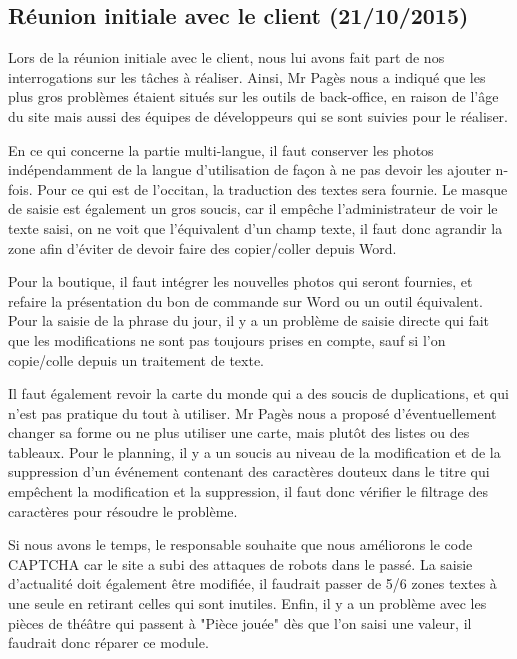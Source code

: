\documentclass[11pt]{report}
\begin{document}
\subsection{Réunion initiale avec le client (21/10/2015)}
Lors de la réunion initiale avec le client, nous lui avons fait part de nos 
interrogations sur les tâches à réaliser. Ainsi, Mr Pagès nous a indiqué que les
plus gros problèmes étaient situés sur les outils de back-office, en raison de 
l'âge du site mais aussi des équipes de développeurs qui se sont suivies pour
le réaliser. \\
\par En ce qui concerne la partie multi-langue, il faut conserver les photos
indépendamment de la langue d'utilisation de façon à ne pas devoir les ajouter
n-fois. Pour ce qui est de l'occitan, la traduction des textes sera fournie.
Le masque de saisie est également un gros soucis, car il empêche
l'administrateur de voir le texte saisi, on ne voit que l'équivalent d'un
champ texte, il faut donc agrandir la zone afin d'éviter de devoir faire des
copier/coller depuis Word. \\
\par Pour la boutique, il faut intégrer les nouvelles photos qui seront
fournies, et refaire la présentation du bon de commande sur Word ou un outil
équivalent. Pour la saisie de la phrase du jour, il y a un problème de saisie
directe qui fait que les modifications ne sont pas toujours prises en compte,
sauf si l'on copie/colle depuis un traitement de texte. \\
\par Il faut également revoir la carte du monde qui a des soucis de
duplications, et qui n'est pas pratique du tout à utiliser. Mr Pagès nous a 
proposé
d'éventuellement changer sa forme ou ne plus utiliser une carte, mais plutôt
des listes ou des tableaux. Pour le planning, il y a un soucis au niveau de la
modification et de la suppression d'un événement contenant des caractères
douteux dans le titre qui empêchent la modification et la suppression, il faut
donc vérifier le filtrage des caractères pour résoudre le problème. \\
\par Si nous avons le temps, le responsable souhaite que nous améliorons le code
CAPTCHA car le site a subi des attaques de robots dans le passé.
La saisie d'actualité doit également être modifiée, il faudrait passer de 5/6
zones textes à une seule en retirant celles qui sont inutiles.
Enfin, il y a un problème avec les pièces de théâtre qui passent à "Pièce
jouée" dès que l'on saisi une valeur, il faudrait donc réparer ce module.
\end{document}
